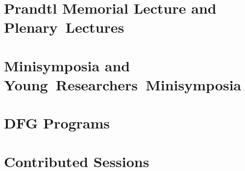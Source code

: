 \documentclass[colorlinks]{gamm-boa}
\begin{document}
\tableofcontents
\chapter{Prandtl Memorial Lecture and Plenary~Lectures}









\chapter{Minisymposia and Young~Researchers~Minisymposia}










\chapter{DFG Programs}






\chapter{Contributed Sessions}




























\printindex
\end{document}
